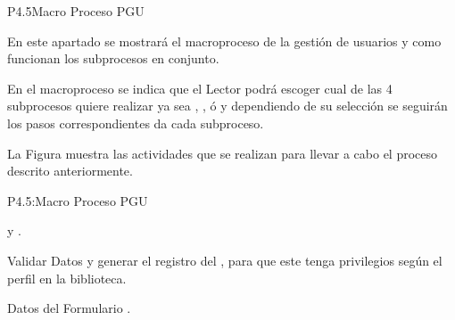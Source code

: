 




\begin{Proceso}{P4.5}{Macro Proceso PGU} {
  

  En este apartado se mostrará el macroproceso de la gestión de usuarios y como funcionan los subprocesos en conjunto.
  
  
En el macroproceso se indica que el Lector podrá escoger cual de las 4 subprocesos quiere realizar ya sea , ,  ó  y dependiendo de su selección se seguirán los pasos correspondientes da cada subproceso.  



  \noindent La Figura  muestra las actividades que se realizan para llevar a cabo el proceso descrito anteriormente.


} {P4.5:Macro Proceso PGU}


   { %
     y .
  }

   { %
    Validar Datos y generar el registro del , para que este tenga privilegios según el perfil en la biblioteca.
  }

   { %
  	\begin{UClist}
  		\UCli Datos del Formulario .
    \end {UClist}
  }
  

\end{Proceso}
